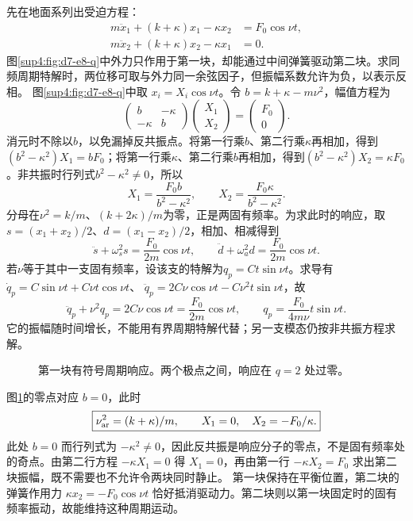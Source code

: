 \begin{solution}
先在地面系列出受迫方程：
\[
\begin{aligned}
m\ddot x_1+(k+\kappa)x_1-\kappa x_2&=F_0\cos\nu t,\\
m\ddot x_2+(k+\kappa)x_2-\kappa x_1&=0.
\end{aligned}
\]
图\ref{sup4:fig:d7-e8-q}中外力只作用于第一块，却能通过中间弹簧驱动第二块。求同频周期特解时，两位移可取与外力同一余弦因子，但振幅系数允许为负，以表示反相。
图\ref{sup4:fig:d7-e8-q}中取 $x_i=X_i\cos\nu t$。令 $b=k+\kappa-m\nu^2$，幅值方程为
\[
\begin{pmatrix}b&-\kappa\\-\kappa&b\end{pmatrix}
\begin{pmatrix}X_1\\X_2\end{pmatrix}=
\begin{pmatrix}F_0\\0\end{pmatrix}.
\]
消元时不除以$b$，以免漏掉反共振点。将第一行乘$b$、第二行乘$\kappa$再相加，得到$(b^2-\kappa^2)X_1=bF_0$；将第一行乘$\kappa$、第二行乘$b$再相加，得到$(b^2-\kappa^2)X_2=\kappa F_0$。非共振时行列式$b^2-\kappa^2\ne0$，所以
\[
\boxed{X_1=\frac{F_0b}{b^2-\kappa^2},\qquad
X_2=\frac{F_0\kappa}{b^2-\kappa^2}.}
\]
分母在$\nu^2=k/m$、$(k+2\kappa)/m$为零，正是两固有频率。为求此时的响应，取$s=(x_1+x_2)/2$、$d=(x_1-x_2)/2$，相加、相减得到
\[
\ddot s+\omega_s^2s=\frac{F_0}{2m}\cos\nu t,\qquad
\ddot d+\omega_a^2d=\frac{F_0}{2m}\cos\nu t.
\]
若$\nu$等于其中一支固有频率，设该支的特解为$q_p=Ct\sin\nu t$。求导有
$\dot q_p=C\sin\nu t+C\nu t\cos\nu t$、
$\ddot q_p=2C\nu\cos\nu t-C\nu^2t\sin\nu t$，故
\[
\ddot q_p+\nu^2q_p=2C\nu\cos\nu t
=\frac{F_0}{2m}\cos\nu t,
\qquad q_p=\frac{F_0}{4m\nu}t\sin\nu t.
\]
它的振幅随时间增长，不能用有界周期特解代替；另一支模态仍按非共振方程求解。
\begin{figure}[H]\centering
{}
\caption{第一块有符号周期响应。两个极点之间，响应在 $q=2$ 处过零。}\label{sup4:fig:d7-e8-s}
\end{figure}
图\ref{sup4:fig:d7-e8-s}的零点对应 $b=0$，此时
\[
\boxed{\nu_{\rm ar}^2=(k+\kappa)/m,\qquad X_1=0,\quad X_2=-F_0/\kappa.}
\]
此处 $b=0$ 而行列式为 $-\kappa^2\ne0$，因此反共振是响应分子的零点，不是固有频率处的奇点。由第二行方程 $-\kappa X_1=0$ 得 $X_1=0$，再由第一行 $-\kappa X_2=F_0$ 求出第二块振幅，既不需要也不允许令两块同时静止。
第一块保持在平衡位置，第二块的弹簧作用力 $\kappa x_2=-F_0\cos\nu t$ 恰好抵消驱动力。第二块则以第一块固定时的固有频率振动，故能维持这种周期运动。


\end{solution}
